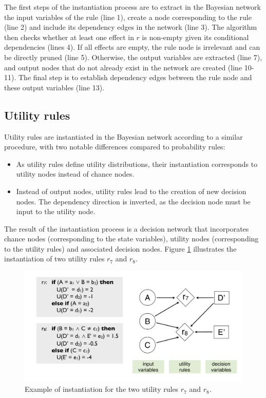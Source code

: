 The first steps of the instantiation process are to extract in the Bayesian network the input variables of the rule (line 1), create a node corresponding to the rule (line 2) and include its dependency edges in the network (line 3).  The algorithm then checks whether at least one effect in $r$ is non-empty given its conditional dependencies (lines 4).  If all effects are empty, the rule node is irrelevant and can be directly pruned (line 5). Otherwise, the output variables are extracted (line 7), and output nodes that do not already exist in the network are created (line 10-11). The final step is to establish dependency edges between the rule node and these output variables (line 13).


\subsection{Utility rules}

Utility rules are instantiated in the Bayesian network according to a similar procedure, with two notable differences compared to probability rules: \begin{itemize}
\item As utility rules define utility distributions, their instantiation corresponds to utility nodes instead of chance nodes.
\item Instead of output nodes, utility rules lead to the creation of new decision nodes. The dependency direction is inverted, as the decision node must be input to the utility node.
\end{itemize} 

The result of the instantiation process is a decision network that incorporates chance nodes (corresponding to the state variables), utility nodes (corresponding to the utility rules) and associated decision nodes. Figure \ref{fig:instantitionutil} illustrates the instantiation of two utility rules $r_7$ and $r_8$. 

\begin{figure}[ht]
\centering
\includegraphics[scale=0.25]{imgs/ruleinstantiation2.pdf}
\caption{Example of instantiation for the two utility rules $r_7$ and $r_8$.}
\label{fig:instantitionutil}
\end{figure}

